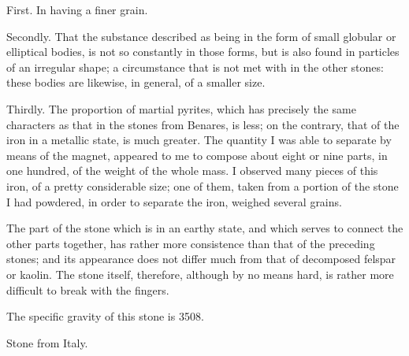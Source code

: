 \documentclass[a4paper, 12pt, oneside, twocolumn]{article}
\begin{document}
First. In having a finer grain.

Secondly. That the substance described as being in the form of small globular or elliptical bodies, is not so constantly in those forms, but is also found in particles of an irregular shape; a circumstance that is not met with in the other stones: these bodies are likewise, in general, of a smaller size.

Thirdly. The proportion of martial pyrites, which has precisely the same characters as that in the stones from Benares, is less; on the contrary, that of the iron in a metallic state, is much greater. The quantity I was able to separate by means of the magnet, appeared to me to compose about eight or nine parts, in one hundred, of the weight of the whole mass. I observed many pieces of this iron, of a pretty considerable size; one of them, taken from a portion of the stone I had powdered, in order to separate the iron, weighed several grains.

The part of the stone which is in an earthy state, and which serves to connect the other parts together, has rather more consistence than that of the preceding stones; and its appearance does not differ much from that of decomposed felspar or kaolin. The stone itself, therefore, although by no means hard, is rather more difficult to break with the fingers.

The specific gravity of this stone is 3508.
\begin{center}
Stone from Italy.
\end{center}
\end{document}
